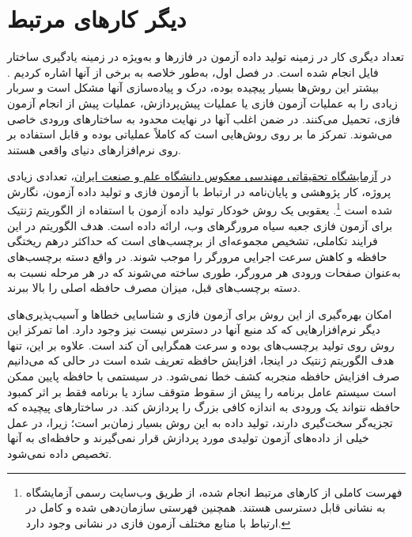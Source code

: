 \section{دیگر کارهای مرتبط}
تعداد دیگری کار در زمینه تولید داده آزمون در فازرها و به‌ویژه در زمینه یادگیری ساختار فایل انجام شده است. در فصل اول، به‌طور خلاصه به‌ برخی از آنها اشاره کردیم
\cite{Bastani:2017:SPI:3140587.3062349, Hoschele:2016:MIG:2970276.2970321}.
بیشتر این روش‌ها بسیار پیچیده بوده، درک و پیاده‌سازی آنها مشکل است و سربار زیادی را به عملیات آزمون فازی یا عملیات پیش‌پردازش، عملیات پیش از انجام آزمون فازی، تحمیل می‌کنند. در ضمن اغلب‌ آنها در نهایت محدود به ساختارهای ورودی خاصی می‌شوند. تمرکز ما بر روی روش‌هایی است که کاملاً عملیاتی بوده و قابل استفاده بر روی نرم‌افزارهای دنیای واقعی هستند.


در 
\href{http://parsa.iust.ac.ir/reverse-engineering-lab/}{آزمایشگاه  تحقیقاتی مهندسی معکوس دانشگاه علم و صنعت ایران}،
 تعدادی زیادی پروژه، کار پژوهشی و پایان‌نامه در ارتباط با آزمون فازی و تولید داده آزمون، نگارش شده است
 \footnote{
فهرست کاملی از کارهای مرتبط انجام شده، از طریق وب‌سایت رسمی آزمایشگاه به نشانی 
\href{http://parsa.iust.ac.ir}{} 
قابل دسترسی هستند. همچنین فهرستی سازمان‌دهی شده و کامل در ارتباط با منابع مختلف آزمون فازی در نشانی 
\href{https://github.com/secfigo/Awesome-Fuzzing}{} 
وجود دارد. 
}.
یعقوبی 
 \cite{yaghoubi1392}
 یک روش خودکار تولید داده آزمون با استفاده از الگوریتم ژنتیک برای آزمون فازی جعبه سیاه مرورگرهای وب، ارائه داده است. هدف الگوریتم در این فرایند تکاملی، تشخيص مجموعه‌ای از برچسب‌های 
 است که حداکثر درهم ريختگی حافظه و کاهش سرعت اجرايی مرورگر را موجب ‌شوند. در واقع دسته برچسب‌های  
 به‌عنوان صفحات ورودی هر مرورگر، طوری ساخته مي‌شوند که در هر مرحله نسبت‌ به ‌دسته برچسب‌های قبل، ميزان مصرف حافظه اصلی را بالا  ببرند. 
 
 امکان بهره‌گیری از این روش برای آزمون فازی و شناسایی خطاها و آسيب‌پذيری‌های دیگر نرم‌افزارهایی که کد منبع آنها در دسترس نيست نیز وجود دارد. اما تمرکز این روش روی تولید برچسب‌های  بوده و سرعت همگرایی آن کند است. علاوه بر این، تنها هدف الگوریتم ژنتیک در اینجا، افزایش حافظه تعریف شده است در حالی که می‌دانیم صرف افزایش حافظه منجربه کشف خطا نمی‌شود. در سیستمی با حافظه پایین ممکن است سیستم عامل برنامه را پیش از سقوط متوقف سازد یا برنامه فقط بر اثر کمبود حافظه نتواند یک ورودی به اندازه کافی بزرگ را پردازش کند. در ساختارهای پیچیده که تجزیه‌گر سخت‌گیری دارند، تولید داده به این روش بسیار زمان‌بر است؛ زیرا، در عمل خیلی از داده‌های آزمون تولیدی مورد پردازش قرار نمی‌گیرند و حافظه‌ای به آنها تخصیص داده ‌نمی‌شود.
 

